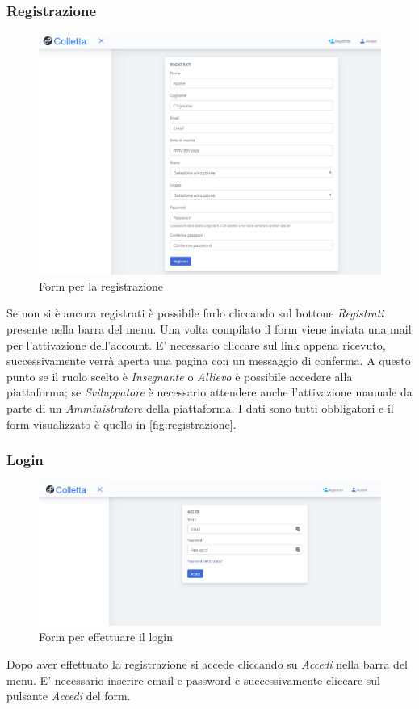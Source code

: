     \subsubsection{Registrazione}
    	\begin{figure}[H]
        	\centering
        	\includegraphics[width=1\linewidth]{sez/img/autenticazione/formRegistrazione.PNG} 
        	\caption{Form per la registrazione}\label{fig:registrazione}
    	\end{figure}
	   Se non si è ancora registrati è possibile farlo cliccando sul bottone \textit{Registrati} presente nella barra del menu. Una volta compilato il form viene inviata una mail per l'attivazione dell'account. E' necessario cliccare sul link appena ricevuto, successivamente verrà aperta una pagina con un messaggio di conferma. A questo punto se il ruolo scelto è \textit{Insegnante} o \textit{Allievo} è possibile accedere alla piattaforma; se \textit{Sviluppatore} è necessario attendere anche l'attivazione manuale da parte di un  \textit{Amministratore} della piattaforma. I dati sono tutti obbligatori e il form visualizzato è quello in \autoref{fig:registrazione}.
    \subsubsection{Login}
    	\begin{figure}[H]
        	\centering
        	\includegraphics[width=1\linewidth]{sez/img/autenticazione/formAccedi.PNG} 
        	\caption{Form per effettuare il login}\label{fig:1}
    	\end{figure}
 	  Dopo aver effettuato la registrazione si accede cliccando su \textit{Accedi} nella barra del menu. E' necessario inserire email e password e successivamente cliccare sul pulsante \textit{Accedi} del form.

